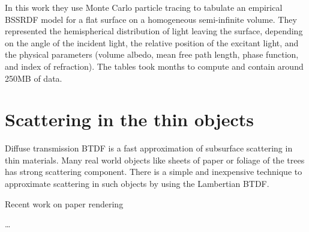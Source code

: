 In this work they use Monte Carlo particle tracing to tabulate an empirical
BSSRDF model for a flat surface on a homogeneous semi-infinite volume.
They represented the hemispherical distribution of light leaving the surface,
depending on the angle of the incident light, the relative position of the
excitant light, and the physical parameters (volume albedo, mean free path
length, phase function, and index of refraction). The tables took months to
compute and contain around 250MB of data.

\section{Scattering in the thin objects}
Diffuse transmission BTDF is a fast approximation of subsurface scattering
in thin materials.
Many real world objects like sheets of paper or foliage of the trees has strong
scattering component. There is a simple and inexpensive technique to approximate
scattering in such objects by using the Lambertian BTDF.

Recent work on paper rendering \cite{DBLP:journals/cgf/PapasMJ14}

\ldots
